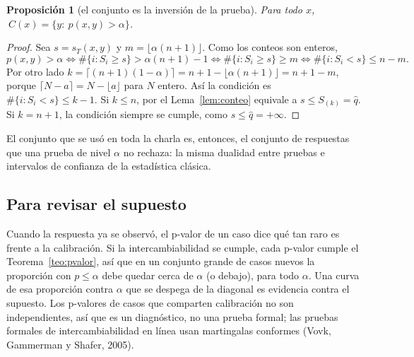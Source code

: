 \documentclass[11pt]{article}
\theoremstyle{plain}
\newtheorem{proposicion}[teorema]{Proposición}
\theoremstyle{definition}
\theoremstyle{remark}
\newcommand{\qhat}{\widehat q}
\begin{document}
\begin{proposicion}[el conjunto es la inversión de la prueba]
Para todo $x$, $\ C(x)=\{y:\ p(x,y)>\alpha\}$.
\end{proposicion}
\begin{proof}
Sea $s=s_T(x,y)$ y $m=\lfloor\alpha(n+1)\rfloor$. Como los conteos son enteros,
\[
 p(x,y)>\alpha\iff\#\{i:S_i\ge s\}>\alpha(n+1)-1\iff\#\{i:S_i\ge s\}\ge m
 \iff\#\{i:S_i<s\}\le n-m .
\]
Por otro lado $k=\lceil(n+1)(1-\alpha)\rceil=n+1-\lfloor\alpha(n+1)\rfloor=n+1-m$, porque
$\lceil N-a\rceil=N-\lfloor a\rfloor$ para $N$ entero. Así la condición es $\#\{i:S_i<s\}\le k-1$. Si
$k\le n$, por el Lema~\ref{lem:conteo} equivale a $s\le S_{(k)}=\qhat$. Si $k=n+1$, la condición
siempre se cumple, como $s\le\qhat=+\infty$.
\end{proof}
El conjunto que se usó en toda la charla es, entonces, el conjunto de respuestas que una prueba de
nivel $\alpha$ no rechaza: la misma dualidad entre pruebas e intervalos de confianza de la
estadística clásica.

\subsection{Para revisar el supuesto}
Cuando la respuesta ya se observó, el p-valor de un caso dice qué tan raro es frente a la
calibración. Si la intercambiabilidad se cumple, cada p-valor cumple el Teorema~\ref{teo:pvalor},
así que en un conjunto grande de casos nuevos la proporción con $p\le\alpha$ debe quedar cerca de
$\alpha$ (o debajo), para todo $\alpha$. Una curva de esa proporción contra $\alpha$ que se despega
de la diagonal es evidencia contra el supuesto. Los p-valores de casos que comparten calibración no
son independientes, así que es un diagnóstico, no una prueba formal; las pruebas formales de
intercambiabilidad en línea usan martingalas conformes (Vovk, Gammerman y Shafer, 2005).
\end{document}
